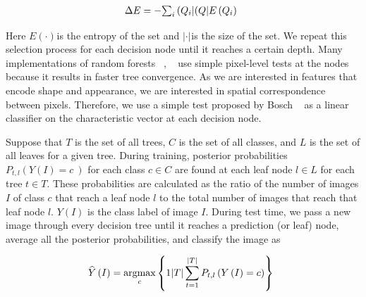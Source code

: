 \let\saveeqnno\theequation
\let\savefrac\frac
\def\dispfrac{\displaystyle\savefrac}
\begin{eqnarray}
\let\frac\dispfrac
\gdef\theequation{2}
\let\theHequation\theequation
\label{disp-formula-group-d27d73835da3454a817782924579e245}
\begin{array}{@{}l}\Delta E=-{\sum_i{\frac{\left(Q_i\right\vert}{\left(Q\right\vert}E\left(Q_i\right)}}\end{array}
\end{eqnarray}
\global\let\theequation\saveeqnno
\addtocounter{equation}{-1}\ignorespaces 

Here $E\left(\cdot\right) $\ensuremath{_{}}is the entropy of the set and $\left\vert \cdot\right\vert $\ensuremath{_{}}is the size of the set. We repeat this selection process for each decision node until it reaches a certain depth. Many implementations of random forests \unskip~\cite{1641075:26775846}, \unskip~\cite{1641075:26775849} use simple pixel-level tests at the nodes because it results in faster tree convergence. As we are interested in features that encode shape and appearance, we are interested in spatial correspondence between pixels. Therefore, we use a simple test proposed by Bosch \unskip~\cite{1641075:26775861} {\textemdash} as a linear classifier on the characteristic vector {\textemdash} at each decision node.

Suppose that $T $ is the set of all trees, $C $ is the set of all classes, and $L $ is the set of all leaves for a given tree. During training, posterior probabilities $P_{t,l}\left(Y\left(I\right)=c\:\right) $ for each class $c\in C $ are found at each leaf node $l\in L $ for each tree $t\in T $. These probabilities are calculated as the ratio of the number of images $I $ of class $c $ that reach a leaf node $l $ to the total number of images that reach that leaf node $l $. $Y\left(I\right) $ is the class label of image $I $. During test time, we pass a new image through every decision tree until it reaches a prediction (or leaf) node, average all the posterior probabilities, and classify the image as

\let\saveeqnno\theequation
\let\savefrac\frac
\def\dispfrac{\displaystyle\savefrac}
\begin{eqnarray}
\let\frac\dispfrac
\gdef\theequation{3}
\let\theHequation\theequation
\label{disp-formula-group-032e1395024b44bca0feeb46474c0adc}
\begin{array}{@{}l}\widehat Y\left(I\right)=\underset c{\text{argmax}}\left\{\frac1{\left\vert T\right\vert}\sum_{t=1}^{\left\vert T\right\vert}P_{t,l}\left(Y\left(I\right)=c\right)\right\}\end{array}
\end{eqnarray}
\global\let\theequation\saveeqnno
\addtocounter{equation}{-1}\ignorespaces 

